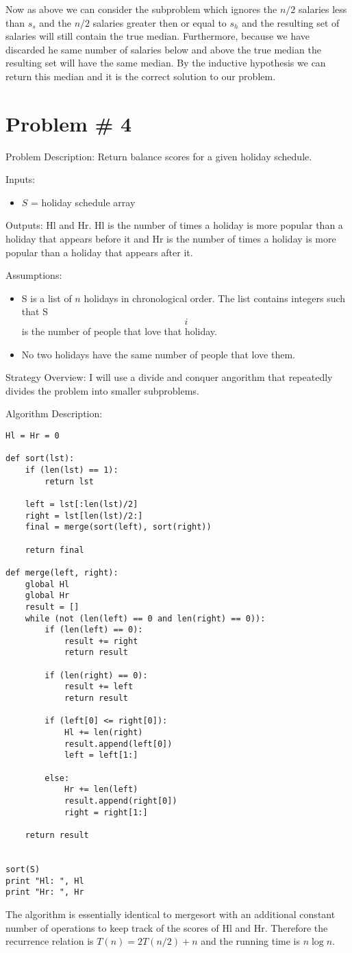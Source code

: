 \documentclass{article}
\begin{document}
Now as above we can consider the subproblem which ignores the $n/2$ salaries less than $s_s$ and the $n/2$ salaries greater then or equal to $s_h$ and the resulting set of salaries will still contain the true median. Furthermore, because we have discarded he same number of salaries below and above the true median the resulting set will have the same median. By the inductive hypothesis we can return this median and it is the correct solution to our problem.
\section*{Problem \# 4}
Problem Description: Return balance scores for a given holiday schedule.

Inputs:
\begin{itemize}
    \item $S$ = holiday schedule array
\end{itemize}

Outputs: Hl and Hr. Hl is the number of times a holiday is more popular than a holiday that appears before it and Hr is the number of times a holiday is more popular than a holiday that appears after it.

Assumptions:
\begin{itemize}
    \item S is a list of $n$ holidays in chronological order. The list contains integers such that S\[i\] is the number of people that love that holiday.
    \item No two holidays have the same number of people that love them.
\end{itemize}

Strategy Overview:
I will use a divide and conquer angorithm that repeatedly divides the problem into smaller subproblems.

Algorithm Description:
\begin{lstlisting}
Hl = Hr = 0

def sort(lst):
    if (len(lst) == 1):
        return lst

    left = lst[:len(lst)/2]
    right = lst[len(lst)/2:]
    final = merge(sort(left), sort(right))
    
    return final

def merge(left, right):
    global Hl
    global Hr
    result = []
    while (not (len(left) == 0 and len(right) == 0)):
        if (len(left) == 0):
            result += right
            return result

        if (len(right) == 0):
            result += left
            return result

        if (left[0] <= right[0]):
            Hl += len(right)
            result.append(left[0])
            left = left[1:]

        else:
            Hr += len(left)
            result.append(right[0])
            right = right[1:]

    return result


sort(S)
print "Hl: ", Hl
print "Hr: ", Hr
\end{lstlisting}
The algorithm is essentially identical to mergesort with an additional constant number of operations to keep track of the scores of Hl and Hr. Therefore the recurrence relation is $T(n) = 2T(n/2) + n$ and the running time is $n\log n$.
\end{document}
